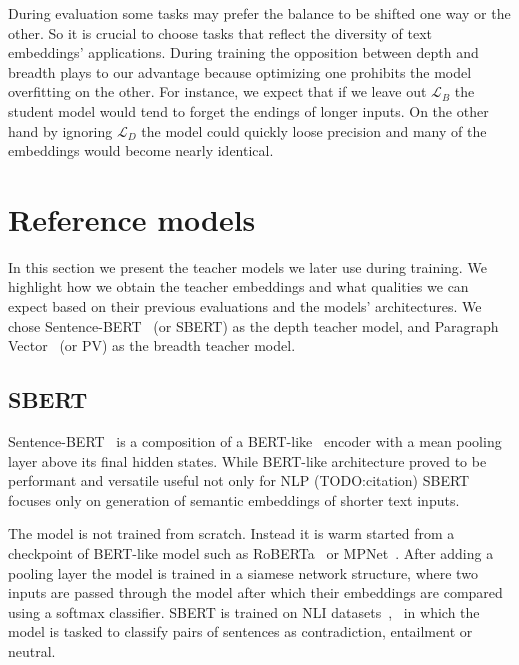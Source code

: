During evaluation some tasks may prefer the balance to be shifted one way or the
other. So it is crucial to choose tasks that reflect the diversity of text
embeddings' applications. During training the opposition between depth and
breadth plays to our advantage because optimizing one prohibits the model
overfitting on the other. For instance, we expect that if we leave out
$\mathcal{L}_B$ the student model would tend to forget the endings of longer
inputs. On the other hand by ignoring $\mathcal{L}_D$ the model could quickly
loose precision and many of the embeddings would become nearly identical.

\section{Reference models}


In this section we present the teacher models we later use during training. We
highlight how we obtain the teacher embeddings and what qualities we can expect
based on their previous evaluations and the models' architectures. We chose
Sentence-BERT~\cite{reimers2020making} (or SBERT) as the depth teacher model,
and Paragraph Vector~\cite{le2014distributed} (or PV) as the breadth teacher
model.

\subsection{SBERT}

Sentence-BERT~\cite{reimers2019sentence} is a composition of a
BERT-like~\cite{devlin2019bert} encoder with a mean pooling layer above its
final hidden states. While BERT-like architecture proved to be performant and
versatile useful not only for NLP (TODO:citation) SBERT focuses only on
generation of semantic embeddings of shorter text inputs.

The model is not trained from scratch. Instead it is warm started from a
checkpoint of BERT-like model such as RoBERTa~\cite{liu2019roberta} or
MPNet~\cite{song2020mpnet}. After adding a pooling layer the model is trained in
a siamese network structure, where two inputs are passed through the model after
which their embeddings are compared using a softmax classifier. SBERT is trained
on NLI datasets~\cite{bowman2015large},~\cite{williams2017broad} in which the
model is tasked to classify pairs of sentences as contradiction, entailment or
neutral.


